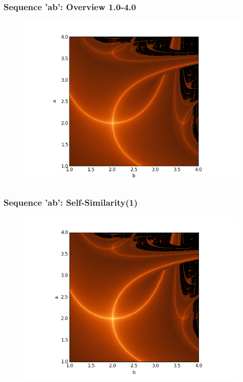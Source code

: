 \documentclass[ignorenonframetext]{beamer}
\begin{document}
\begin{frame}
\frametitle{Sequence 'ab': Overview 1.0-4.0}
\begin{figure}[htbp]
\vspace*{5pt}
\includegraphics[scale = 0.5]{pictures/Overview_ab.png}
\end{figure}
\end{frame}

\begin{frame}
\frametitle{Sequence 'ab': Self-Similarity(1)}
\begin{figure}[htbp]
\vspace*{5pt}
\includegraphics[scale = 0.5]{pictures/ab_selfsim_1.png}
\end{figure}
\end{frame}
\end{document}
